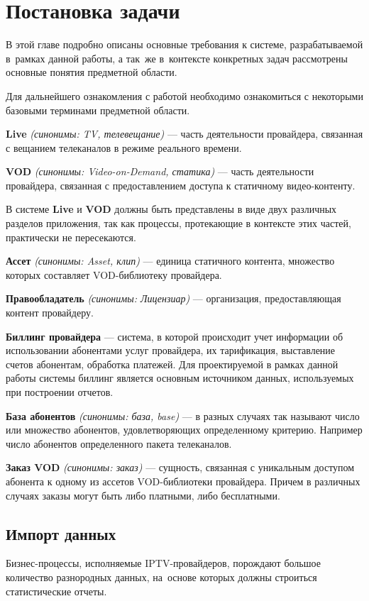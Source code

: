 \section{Постановка задачи}

В этой главе подробно описаны основные требования к системе, разрабатываемой в~рамках данной работы,
а так~же в~контексте конкретных задач рассмотрены основные понятия предметной области. 

Для дальнейшего ознакомления с работой необходимо ознакомиться с некоторыми базовыми терминами предметной области.

\textbf{Live} \textit{(синонимы: TV, телевещание)} --- часть деятельности провайдера, связанная с вещанием
телеканалов в режиме реального времени.

\textbf{VOD} \textit{(синонимы: Video-on-Demand, статика)} --- часть деятельности провайдера, связанная 
с предоставлением доступа к статичному видео-контенту.

В системе \textbf{Live} и \textbf{VOD} должны быть представлены в виде двух различных разделов приложения,
так как процессы, протекающие в контексте этих частей, практически не пересекаются.

\label{gloss:asset}
\textbf{Ассет} \textit{(синонимы: Asset, клип)} --- единица статичного контента, множество которых составляет
VOD-библиотеку провайдера.

\textbf{Правообладатель} \textit{(синонимы: Лицензиар)} --- организация, предоставляющая контент провайдеру.

\textbf{Биллинг провайдера} --- система, в которой происходит учет информации об использовании абонентами услуг провайдера, их тарификация, 
выставление счетов абонентам, обработка платежей. Для проектируемой в рамках данной работы системы биллинг является основным источником
данных, используемых при построении отчетов.

\textbf{База абонентов} \textit{(синонимы: база, base)} --- в разных случаях так называют число или множество абонентов,
удовлетворяющих определенному критерию. Например число абонентов определенного пакета телеканалов.

\textbf{Заказ VOD} \textit{(синонимы: заказ)} --- сущность, связанная с уникальным доступом абонента к одному из
ассетов VOD-библиотеки провайдера. Причем в различных случаях заказы могут быть либо платными, либо бесплатными. 

\subsection{Импорт данных}
Бизнес-процессы, исполняемые IPTV-провайдеров, порождают большое количество разнородных данных, 
на~основе которых должны строиться статистические отчеты.


